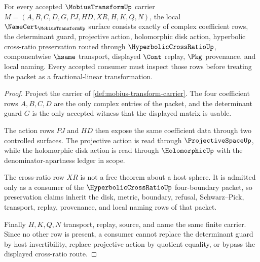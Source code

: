 \begin{theorem}
\label{thm:mobius-transform-namecert-obligations}
For every accepted $\MobiusTransformUp$ carrier $M=(A,B,C,D,G,PJ,HD,XR,H,K,Q,N)$, the local $\NameCert_{\MobiusTransformUp}$ surface consists exactly of complex coefficient rows, the determinant guard, projective action, holomorphic disk action, hyperbolic cross-ratio preservation routed through $\HyperbolicCrossRatioUp$, componentwise $\hsame$ transport, displayed $\Cont$ replay, $\Pkg$ provenance, and local naming. Every accepted consumer must inspect those rows before treating the packet as a fractional-linear transformation.
\end{theorem}
\begin{proof}
Project the carrier of \autoref{def:mobius-transform-carrier}. The four coefficient rows $A,B,C,D$ are the only complex entries of the packet, and the determinant guard $G$ is the only accepted witness that the displayed matrix is usable.

The action rows $PJ$ and $HD$ then expose the same coefficient data through two controlled surfaces. The projective action is read through $\ProjectiveSpaceUp$, while the holomorphic disk action is read through $\HolomorphicUp$ with the denominator-apartness ledger in scope.

The cross-ratio row $XR$ is not a free theorem about a host sphere. It is admitted only as a consumer of the $\HyperbolicCrossRatioUp$ four-boundary packet, so preservation claims inherit the disk, metric, boundary, refusal, Schwarz--Pick, transport, replay, provenance, and local naming rows of that packet.

Finally $H,K,Q,N$ transport, replay, source, and name the same finite carrier. Since no other row is present, a consumer cannot replace the determinant guard by host invertibility, replace projective action by quotient equality, or bypass the displayed cross-ratio route.
\end{proof}

